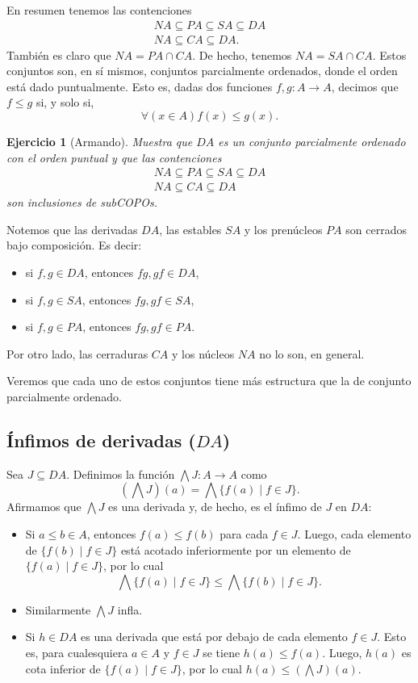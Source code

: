 \documentclass[12pt,letterpaper,titlepage]{article}
\newtheorem{exe}{Ejercicio}
\theoremstyle{definition}
\newcommand\Inf{\bigwedge}
\newcommand\tps[1]{\texorpdfstring{#1}{}}
\newcommand\<{\langle}
\renewcommand\>{\rangle}
\begin{document}
En resumen tenemos las contenciones
\begin{align*}
  NA \subseteq PA \subseteq SA \subseteq DA \\
  NA \subseteq CA \subseteq DA.
\end{align*}
También es claro que $NA=PA\cap CA$.
De hecho, tenemos $NA=SA\cap CA$.
Estos conjuntos son, en sí mismos, conjuntos parcialmente
ordenados, donde el orden está dado puntualmente.
Esto es, dadas dos funciones $f,g:A\to A$, decimos que $f\leq g$
si, y solo si,
\[
  \forall(x\in A) f(x)\leq g(x)
.\]
\begin{exe}[Armando]
  Muestra que $DA$ es un conjunto parcialmente ordenado con el
  orden puntual y que las contenciones
  \begin{align*}
    NA \subseteq PA \subseteq SA \subseteq DA \\
    NA \subseteq CA \subseteq DA
  \end{align*}
  son inclusiones de subCOPOs.
\end{exe}

Notemos que las derivadas $DA$, las estables $SA$ y los
prenúcleos $PA$ son cerrados bajo composición.
Es decir:
\begin{itemize}
  \item si $f,g\in DA$, entonces $fg,gf\in DA$,
  \item si $f,g\in SA$, entonces $fg,gf\in SA$,
  \item si $f,g\in PA$, entonces $fg,gf\in PA$.
\end{itemize}
Por otro lado, las cerraduras $CA$ y los núcleos $NA$
no lo son, en general.

Veremos que cada uno de estos conjuntos tiene más
estructura que la de conjunto parcialmente ordenado.

\subsection{Ínfimos de derivadas \tps{($DA$)}}

Sea $J\subseteq DA$.
Definimos la función $\Inf J:A\to A$ como
\[
  (\Inf J)(a) = \Inf\{f(a) \mid f\in J\}
.\]
Afirmamos que $\Inf J$ es una derivada y, de hecho, es el ínfimo
de $J$ en $DA$:
\begin{itemize}
  \item
  Si $a\leq b\in A$, entonces $f(a)\leq f(b)$ para cada $f\in J$.
  Luego, cada elemento de $\{f(b)\mid f\in J\}$ está acotado
  inferiormente por un elemento de $\{f(a)\mid f\in J\}$, por lo
  cual
  \[
    \Inf\{f(a)\mid f\in J\} \leq \Inf\{f(b)\mid f\in J\}
  .\]
  \item
  Similarmente $\Inf J$ infla.
  \item
  Si $h\in DA$ es una derivada que está por debajo de cada
  elemento $f\in J$.
  Esto es, para cualesquiera $a\in A$ y $f\in J$ se tiene
  $h(a)\leq f(a)$.
  Luego, $h(a)$ es cota inferior de $\{f(a) \mid f\in J\}$, por
  lo cual $h(a)\leq (\Inf J)(a)$.
\end{itemize}
\end{document}
